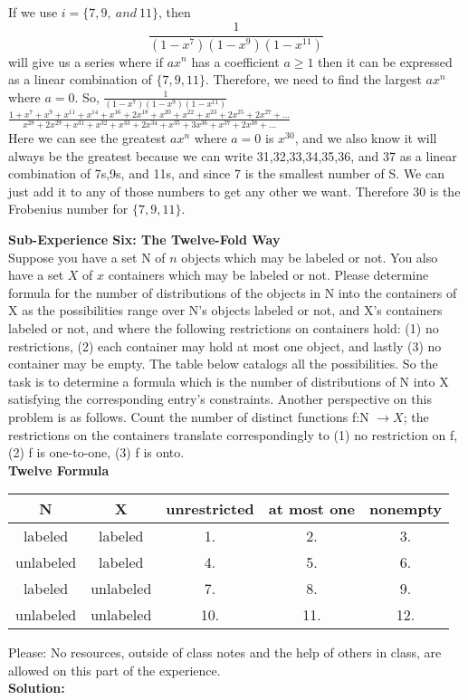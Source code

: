 \documentclass[10pt,a4paper]{report}
\begin{document}
	If we use $i = \{7,9,\ and\ 11\}$, then 
	\[\frac{1}{(1-x^7)(1-x^9)(1-x^{11})}\]
	will give us a series where if $ax^n$ has a coefficient $a\geq1$ then it can be expressed as a linear combination of $\{7,9,11\}$.  Therefore, we need to find the largest $ax^n$ where $a=0$.  So, $\frac{1}{(1-x^7)(1-x^9)(1-x^{11})}$\\
	$\frac{1 + x^7 + x^9 + x^{11} + x^{14} + x^{16} + 2x^{18} + x^{20} + x^{22} + x^{23} + 2x^{25} + 2x^{27} + ...}{x^{28} + 2x^{29} + x^{31} + x^{32} + x^{33} + 2x^{34} + x^{35} + 3x^{36} + x^{37} + 2x^{38} + ...}$\\
	Here we can see the greatest $ax^n$ where $a=0$ is $x^{30}$, and we also know it will always be the greatest because we can write 31,32,33,34,35,36, and 37 as a linear combination of 7s,9s, and 11s, and since 7 is the smallest number of S.  We can just add it to any of those numbers to get any other we want.  Therefore 30 is the Frobenius number for $\{7,9,11\}$.


	\textbf{Sub-Experience Six: The Twelve-Fold Way}\\
	Suppose you have a set N of $n$ objects which may be labeled or not.  You also have a set $X$ of $x$ containers which may be labeled or not.  Please determine formula for the number of distributions of the objects in N into the containers of X as the possibilities range over N's objects labeled or not, and X's containers labeled or not, and where the following restrictions on containers hold:  (1) no restrictions,  (2) each container may hold at most one object, and lastly (3) no container may be empty.  The table below catalogs all the possibilities.  So the task is to determine a formula which is the number of distributions of N into X satisfying the corresponding entry's constraints.  Another perspective on this problem is as follows.  Count the number of distinct functions f:N $\rightarrow X$; the restrictions on the containers translate correspondingly to (1) no restriction on f, (2) f is one-to-one, (3) f is onto.\\
	\newline
	\textbf{Twelve Formula}\\
	\begin{center}
		\begin{tabular}{c|c||c|c|c}
			\hline
			N&X&unrestricted&at most one&nonempty\\
			\hline
			labeled&labeled&1.&2.&3.\\
			unlabeled&labeled&4.&5.&6.\\
			labeled&unlabeled&7.&8.&9.\\
			unlabeled&unlabeled&10.&11.&12.\\
			\hline
			\end{tabular}
	\end{center}
	Please: No resources, outside of class notes and the help of others in class, are allowed on this part of the experience.\\
	\newline
	\textbf{Solution: }\\
	\newline
\end{document}

